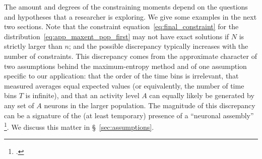 \documentclass[\ifafour a4paper,12pt,\else a5paper,10pt,\fi%
onecolumn,oneside,article,%
british%
]{memoir}
\theoremstyle{remark}
\theoremstyle{innote}
\newcommand*{\citep}{\footcites}
\renewcommand*{\|}{\nonscript\,\vert\nonscript\;\mathopen{}}
\newcommand*{\sect}{\S}%
\newcommand*{\chap}{ch.}%
\newcommand*{\yAv}{A}
\newcommand*{\yA}{\yAv}%
\begin{document}
The amount and degrees of the constraining moments depend on the questions
and hypotheses that a researcher is exploring. We give some examples in the
next two sections. Note that the constraint
equation~\eqref{eq:final_constraint} for the
distribution~\eqref{eq:app_maxent_pop_first} may not have exact solutions
if $N$ is strictly larger than $n$; and the possible discrepancy typically
increases with the number of constraints. This discrepancy comes from the
approximate character of two assumptions behind the maximum-entropy method
and of one assumption specific to our application: that the order of the
time bins is irrelevant, that measured averages equal expected values (or
equivalently, the number of time bins $T$ is infinite), and that an
activity level $\yA$ can equally likely be generated by any set of $\yA$
neurons in the larger population. The magnitude of this discrepancy can be
a signature of the (at least temporary) presence of a \enquote{neuronal
  assembly} \citep[\chap~12]{gerstneretal2014}{hebb1949_r2002}. We discuss
this matter in \sect~\ref{sec:assumptions}.



\bigskip
\end{document}
